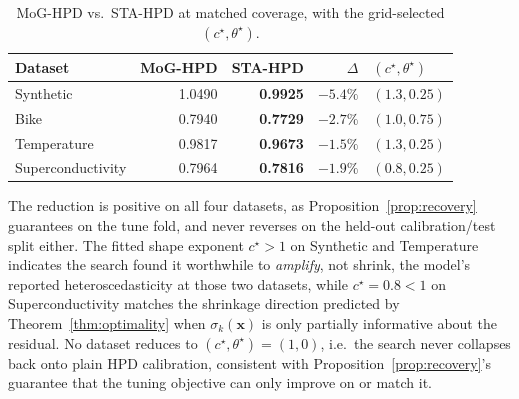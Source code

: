 \documentclass[10pt,twocolumn,a4paper]{article}
\begin{document}
\begin{table}[H]
\centering
\caption{MoG-HPD vs.\ STA-HPD at matched coverage, with the grid-selected $(c^\star,\theta^\star)$.}
\label{tab:results}
\begin{tabular}{@{}lrrrl@{}}
\toprule
\textbf{Dataset} & \textbf{MoG-HPD} & \textbf{STA-HPD} & $\Delta$ & $(c^\star,\theta^\star)$ \\
\midrule
Synthetic & 1.0490 & \textbf{0.9925} & $-5.4\%$ & $(1.3, 0.25)$ \\
Bike & 0.7940 & \textbf{0.7729} & $-2.7\%$ & $(1.0, 0.75)$ \\
Temperature & 0.9817 & \textbf{0.9673} & $-1.5\%$ & $(1.3, 0.25)$ \\
Superconductivity & 0.7964 & \textbf{0.7816} & $-1.9\%$ & $(0.8, 0.25)$ \\
\bottomrule
\end{tabular}
\end{table}

The reduction is positive on all four datasets, as Proposition~\ref{prop:recovery} guarantees on
the tune fold, and never reverses on the held-out calibration/test split either. The fitted shape
exponent $c^\star>1$ on Synthetic and Temperature indicates the search found it worthwhile to
\emph{amplify}, not shrink, the model's reported heteroscedasticity at those two datasets, while
$c^\star=0.8<1$ on Superconductivity matches the shrinkage direction predicted by
Theorem~\ref{thm:optimality} when $\sigma_k(\bm x)$ is only partially informative about the
residual. No dataset reduces to $(c^\star,\theta^\star)=(1,0)$, i.e.\ the search never collapses
back onto plain HPD calibration, consistent with Proposition~\ref{prop:recovery}'s guarantee that
the tuning objective can only improve on or match it.

\end{document}
